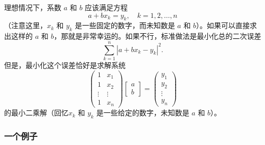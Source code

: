 理想情况下，系数 $a$ 和 $b$ 应该满足方程
$$a + bx_k = y_k, \quad k = 1, 2, \dots, n$$
（注意这里，$x_k$ 和 $y_k$ 是一些固定的数字，而未知数是 $a$ 和 $b$）。如果可以直接求出这样的 $a$ 和 $b$，那就是非常幸运的。如果不行，标准做法是最小化总的二次误差 $$\sum_{k=1}^n |a + bx_k - y_k|^2.$$
但是，最小化这个误差恰好是求解系统
$$\begin{pmatrix} 1 & x_1 \\ 1 & x_2 \\ \vdots & \vdots \\ 1 & x_n \end{pmatrix} \begin{bmatrix} a \\ b \end{bmatrix} = \begin{pmatrix} y_1 \\ y_2 \\ \vdots \\ y_n \end{pmatrix}$$
的最小二乘解（回忆$x_k$ 和 $y_k$ 是一些给定的数字，未知数是 $a$ 和 $b$）。

\subsubsection{一个例子}\label{sec:05-04-03-01}

